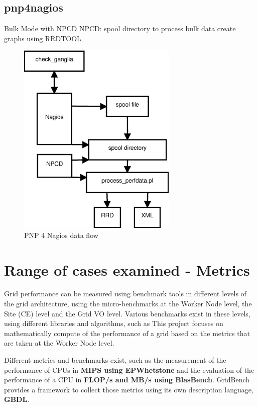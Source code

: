 \subsection{pnp4nagios}

Bulk Mode with NPCD
NPCD:
spool directory to process bulk data
create graphs using RRDTOOL

\begin{figure}[htb]
\centering
 \includegraphics[width=3in]{images/npcd_pnp4nagios.eps}
\caption{PNP 4 Nagios data flow}
\label{figure:pnp4nagios}
\end{figure}
\newpage

\section{Range of cases examined - Metrics}

Grid performance can be measured using benchmark tools in different levels of the grid architecture, using the micro-benchmarks at the Worker Node level, the Site (CE) level and the Grid VO level. Various benchmarks exist in these levels, using different libraries and algorithms, such as This project focuses on mathematically compute of the performance of a grid based on the metrics that are taken at the Worker Node level.

Different metrics and benchmarks exist, such as the measurement of the performance of CPUs in {\bf MIPS using EPWhetstone} and the evaluation of the performance of a CPU in {\bf FLOP/s and MB/s using BlasBench}. GridBench \cite{gridbench} provides a framework to collect those metrics using its own description language, {\bf GBDL}.

